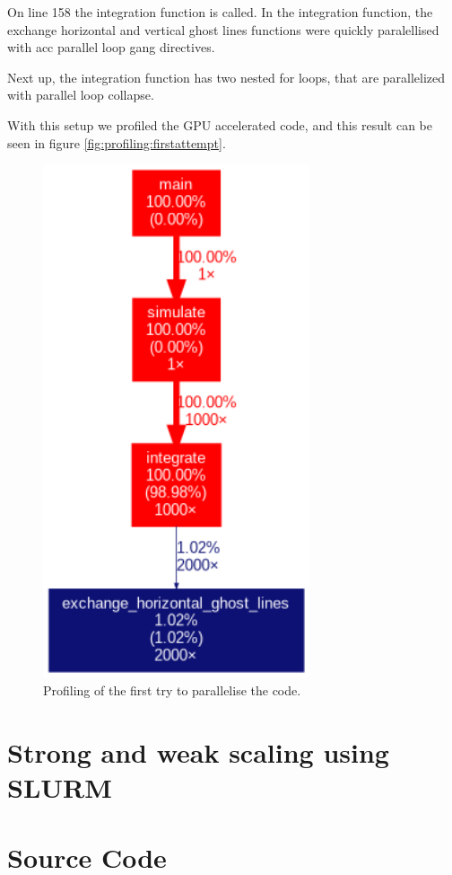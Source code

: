 \documentclass{article}
\begin{document}
On line 158 the integration function is called. In the integration function, the exchange horizontal and vertical ghost lines functions were quickly paralellised with acc parallel loop gang directives.

Next up, the integration function has two nested for loops, that are parallelized with parallel loop collapse.

With this setup we profiled the GPU accelerated code, and this result can be seen in figure \ref{fig:profiling:firstattempt}.
\begin{figure}[H]
    \includegraphics[width=0.7\textwidth]{./figures/sequential_profile.png}
    \centering
    \caption*{Profiling of the first try to parallelise the code. }
\end{figure}


\section{Strong and weak scaling using SLURM}



\FloatBarrier
\section{Source Code}
\label{sec:source}

\end{document}
